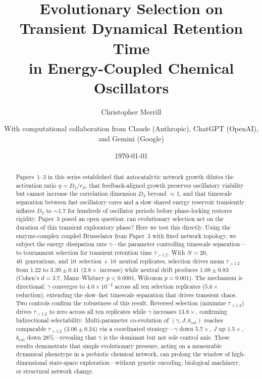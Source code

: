 \documentclass[twocolumn,showpacs,preprintnumbers,amsmath,amssymb,prd,floatfix]{revtex4-2}
\newcommand{\tauexp}{\tau_{>1.2}}
\newcommand{\Dtwo}{D_2}
\newcommand{\kcat}{k_{\mathrm{cat}}}
\begin{document}
\title{Evolutionary Selection on Transient Dynamical Retention Time\\
in Energy-Coupled Chemical Oscillators}

\author{Christopher Merrill}
\author{With computational collaboration from Claude (Anthropic), ChatGPT (OpenAI), and Gemini (Google)}

\date{\today}

\begin{abstract}
Papers~1--3 in this series established that autocatalytic network growth dilutes the activation ratio $\eta = \Dtwo/r_S$, that feedback-aligned growth preserves oscillatory viability but cannot increase the correlation dimension $\Dtwo$ beyond $\approx 1$, and that timescale separation between fast oscillatory cores and a slow shared energy reservoir transiently inflates $\Dtwo$ to $\sim$1.7 for hundreds of oscillator periods before phase-locking restores rigidity. Paper~3 posed an open question: can evolutionary selection act on the duration of this transient exploratory phase? Here we test this directly. Using the enzyme-complex coupled Brusselator from Paper~3 with fixed network topology, we subject the energy dissipation rate $\gamma$---the parameter controlling timescale separation---to tournament selection for transient retention time $\tauexp$. With $N = 20$, 40~generations, and 10~selection $+$ 10~neutral replicates, selection drives mean $\tauexp$ from $1.22$ to $3.39 \pm 0.41$ ($2.8\times$ increase) while neutral drift produces $1.08 \pm 0.83$ (Cohen's $d = 3.7$, Mann--Whitney $p < 0.0001$, Wilcoxon $p = 0.001$). The mechanism is directional: $\gamma$ converges to $4.0 \times 10^{-4}$ across all ten selection replicates ($5.6\times$ reduction), extending the slow--fast timescale separation that drives transient chaos. Two controls confirm the robustness of this result. Reversed selection (minimize $\tauexp$) drives $\tauexp$ to zero across all ten replicates while $\gamma$ increases $13.8\times$, confirming bidirectional selectability. Multi-parameter co-evolution of $(\gamma, J, \kcat)$ reaches comparable $\tauexp$ ($3.06 \pm 0.24$) via a coordinated strategy---$\gamma$ down $5.7\times$, $J$ up $1.5\times$, $\kcat$ down $28\%$---revealing that $\gamma$ is the dominant but not sole control axis. These results demonstrate that simple evolutionary pressure, acting on a measurable dynamical phenotype in a prebiotic chemical network, can prolong the window of high-dimensional state-space exploration---without genetic encoding, biological machinery, or structural network change.
\end{abstract}
\end{document}
